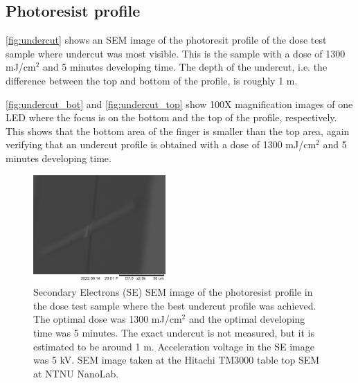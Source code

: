 
\subsection{Photoresist profile}

\autoref{fig:undercut} shows an SEM image of the photoresit profile of the dose test sample where undercut was most visible.
This is the sample with a dose of 1300 mJ/cm$^2$ and 5 minutes developing time.
The depth of the undercut, i.e. the difference between the top and bottom of the profile, is roughly 1 \textmu m.

\autoref{fig:undercut_bot} and \autoref{fig:undercut_top} show 100X magnification images of one LED where the focus is on the bottom and the top of the profile, respectively.
This shows that the bottom area of the finger is smaller than the top area, again verifying that an undercut profile is obtained with a dose of 1300 mJ/cm$^2$ and 5 minutes developing time.

\begin{figure}[ht]
    \centering
    \includegraphics[width=0.45\textwidth]{figures/Undercut_5min_1200mJcm-2.jpg}
    \caption{
        Secondary Electrons (SE) SEM image of the photoresist profile in the dose test sample where the best undercut profile was achieved.
        The optimal dose was 1300 mJ/cm$^2$ and the optimal developing time was 5 minutes.
        The exact undercut is not measured, but it is estimated to be around 1 \textmu m.
        Acceleration voltage in the SE image was 5 kV.
        SEM image taken at the Hitachi TM3000 table top SEM at NTNU NanoLab.
    }
    \label{fig:undercut}
\end{figure}

